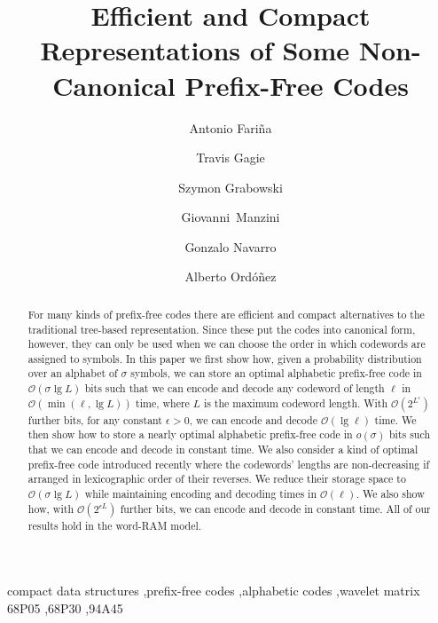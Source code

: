 \documentclass[preprint,12pt]{elsarticle}
\newcommand{\Oh}[1]{\ensuremath{\mathcal{O}\!\left({#1}\right)}}
\renewcommand{\log}{\lg}
\begin{document}
\begin{frontmatter}

\title{Efficient and Compact Representations of Some Non-Canonical Prefix-Free Codes}

\author[udc]{Antonio Fari\~na}
\author[udp,cebib]{Travis Gagie}
\author[lodz]{Szymon Grabowski}
\author[upo,cnr]{\mbox{Giovanni Manzini}}
\author[cebib,imfd,chile]{Gonzalo Navarro}
\author[ebay]{Alberto Ord\'o\~nez}


\address[udc]{Universidade da Coru\~na and Centro de Investigaci\'on CITIC, A Coru\~na, Spain}
\address[udp]{Dalhousie University, Canada}
\address[cebib]{Center for Biotechnology and Bioengineering (CeBiB), Chile}
\address[lodz]{Institute of Applied Computer Science, Lodz University of Technology, Poland}
\address[upo]{Department of Computer Science, University of Pisa, Italy}
\address[cnr]{IIT-CNR, Pisa, Italy}
\address[imfd]{Millennium Institute for Foundational Research on Data (IMFD), Chile}
\address[chile]{Department of Computer Science, University of Chile, Chile}
\address[ebay]{Pinterest Inc., CA, USA}

\begin{abstract}
For many kinds of prefix-free codes there are efficient and compact alternatives to the traditional tree-based representation.  Since these put the codes into canonical form, however, they can only be used when we can choose the order in which codewords are assigned to symbols.  In this paper we first show how, given a probability distribution over an alphabet of $\sigma$ symbols, we can store an optimal alphabetic prefix-free code in $\Oh{\sigma \log L}$ bits such that we can encode and decode any codeword of length $\ell$ in $\Oh{\min (\ell, \log L)}$ time, where $L$ is the maximum codeword length.  With $\Oh{2^{L^\epsilon}}$ further bits, for any constant $\epsilon>0$, we can encode and decode $\Oh{\log \ell}$ time.  We then show how to store a nearly optimal alphabetic prefix-free code in \(o (\sigma)\) bits such that we can encode and decode in constant time.  We also consider a kind of optimal prefix-free code introduced recently where the codewords' lengths are non-decreasing if arranged in lexicographic order of their reverses.  We reduce their storage space to $\Oh{\sigma \log L}$ while maintaining encoding and decoding times in $\Oh{\ell}$. We also show how, with $\Oh{2^{\epsilon L}}$ further bits, we can encode and decode in constant time.
All of our results hold in the word-RAM model.
\end{abstract}

\begin{keyword}
compact data structures \sep prefix-free codes \sep alphabetic codes \sep wavelet matrix
\MSC[2010] 68P05 \sep 68P30 \sep 94A45
\end{keyword}

\end{frontmatter}
\end{document}
